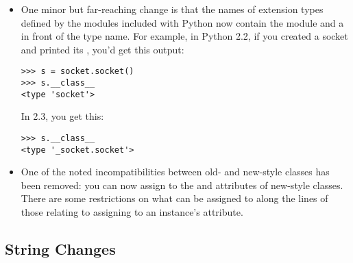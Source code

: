 \documentclass{howto}
\begin{document}
\begin{itemize}
\item One minor but far-reaching change is that the names of extension
types defined by the modules included with Python now contain the
module and a  in front of the type name.  For example, in
Python 2.2, if you created a socket and printed its
, you'd get this output:

\begin{verbatim}
>>> s = socket.socket()
>>> s.__class__
<type 'socket'>
\end{verbatim}

In 2.3, you get this:
\begin{verbatim}
>>> s.__class__
<type '_socket.socket'>
\end{verbatim}

\item One of the noted incompatibilities between old- and new-style
  classes has been removed: you can now assign to the
   and  attributes of new-style
  classes.  There are some restrictions on what can be assigned to
   along the lines of those relating to assigning to
  an instance's  attribute.

\end{itemize}


\subsection{String Changes}
\end{document}
